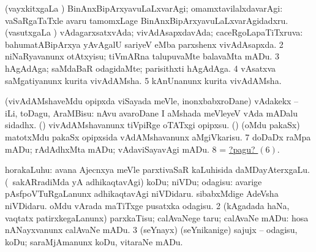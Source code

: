 \noindent 
\gl{\pagu}
\bmng
\bnum
{}  
\banum
{} (vayxkitxgaLa \vi) BinAnxBipArxyavuLaLxvarAgi; omamxtavilalxdavarAgi:  vaSaRgaTaTxle avaru tamomxLage BinAnxBipArxyavuLaLxvarAgidadxru. 
 (vasutxgaLa \vi) vAdagarxsatxvAda; vivAdAsapxdavAda; caceRgoLapaTiTxruva:  bahumatABipArxya yAvAgalU sariyeV eMba parxshenx vivAdAsapxda. 
\eanum
\numie
\num{2}  niNaRyavanunx otAtxyisu; tiVmARna talupuvaMte balavaMta mADu. 
\num{3}  hAgAdAga; saMdaBaR odagidaMte; parisithxti hAgAdAga. 
\num{4}  vAsatxva saMgatiyanunx kurita vivAdAMsha. 
\num{5}  kAnUnanunx kurita vivAdAMsha. 
\hypertarget{issue1 pagu6}{} 
  
\banum
{} (vivAdAMshaveMdu opipxda viSayada meVle, inonxbabxroDane) vAdakekx -- iLi, toDagu, AraMBisu:  nAvu avaroDane I aMshada meVleyeV vAda mADalu sidadhx. 
 (\nAyxshA) vivAdAMshavanunx tiVpiRge oTATxgi opipxsu. 
 (\nAyxshA) (oMdu pakaSx) matotxMdu pakaSx opipxsida vAdAMshavanunx aMgiVkarisu. 
\eanum
\numie
\num{7}  doDaDx raMpa mADu; rAdAdhxMta mADu; vAdaviSayavAgi mADu. 
\num{8}  = \hyperlink{issue1 pagu6}{?pagu? \((6)\)}. 
\enum
\emng
\eentry

\bentry
{}
\gl{\kirx}
\bmng
\sakirx 
\bnum
{} 
\banum
{} horakaLuhu:  avana Ajecnxya meVle parxtivaSaR kaLuhisida daMDayAterxgaLu. 
 (\kanmu\ sakARradiMda yA adhikaqtavAgi) koDu; niVDu; odagisu:  avarige pAsfpoVTuRgaLanunx adhikaqtavAgi niVDidaru.  sibabxMdige AdeVsha niVDidaru.  oMdu vArada maTiTxge pusatxka odagisu. 
\eanum
\numie
\num{2} (kAgadada haNa, vaqtatx patirxkegaLanunx) parxkaTisu; calAvaNege taru; calAvaNe mADu:  hosa nANayxvanunx calAvaNe mADu. 
\num{3} (seYnayx) (seYnikanige) sajujx -- odagisu, koDu; saraMjAmanunx koDu, vitaraNe mADu. 
\enum
\emng

